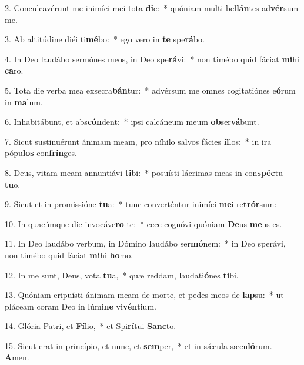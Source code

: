 2. Conculcavérunt me inimíci mei tota \textbf{di}e:~*  quóniam multi bel\textbf{lán}tes ad\textbf{vér}sum me.\

3. Ab altitúdine diéi ti\textbf{mé}bo:~*  ego vero in \textbf{te} spe\textbf{rá}bo.\

4. In Deo laudábo sermónes meos, in Deo spe\textbf{rá}vi:~*  non timébo quid fáciat \textbf{mi}hi \textbf{ca}ro.\

5. Tota die verba mea exsecra\textbf{bán}tur:~*  advérsum me omnes cogitatiónes e\textbf{ó}rum in \textbf{ma}lum.\

6. Inhabitábunt, et abs\textbf{cón}dent:~*  ipsi calcáneum meum \textbf{ob}ser\textbf{vá}bunt.\

7. Sicut sustinuérunt ánimam meam, pro níhilo salvos fácies \textbf{il}los:~*  in ira pópu\textbf{los} con\textbf{frín}ges.\

8. Deus, vitam meam annuntiávi \textbf{ti}bi:~*  posuísti lácrimas meas in con\textbf{spéc}tu \textbf{tu}o.\

9. Sicut et in promissióne \textbf{tu}a:~*  tunc converténtur inimíci \textbf{me}i re\textbf{trór}sum:\

10. In quacúmque die invocáve\textbf{ro} te:~*  ecce cognóvi quóniam \textbf{De}us \textbf{me}us es.\

11. In Deo laudábo verbum, in Dómino laudábo ser\textbf{mó}nem:~*  in Deo sperávi, non timébo quid fáciat \textbf{mi}hi \textbf{ho}mo.\

12. In me sunt, Deus, vota \textbf{tu}a,~*  quæ reddam, laudati\textbf{ó}nes \textbf{ti}bi.\

13. Quóniam eripuísti ánimam meam de morte, et pedes meos de \textbf{lap}su:~*  ut pláceam coram Deo in lúmi\textbf{ne} vi\textbf{vén}tium.\

14. Glória Patri, et \textbf{Fí}lio,~*  et Spi\textbf{rí}tui \textbf{Sanc}to.\

15. Sicut erat in princípio, et nunc, et \textbf{sem}per,~*  et in sǽcula sæcu\textbf{ló}rum. \textbf{A}men.\

